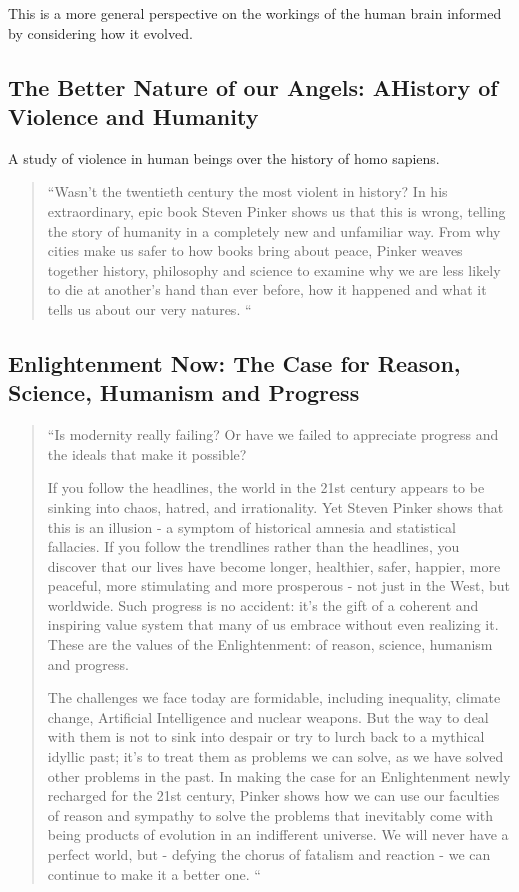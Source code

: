 \documentclass[10pt,titlepage]{book}
\begin{document}
This is a more general perspective on the workings of the human brain informed by considering how it evolved.

\subsection{The Better Nature of our Angels: AHistory of Violence and Humanity \cite{pinker-angels}}

A study of violence in human beings over the history of homo sapiens.

\begin{quote}
``Wasn't the twentieth century the most violent in history? In his extraordinary, epic book Steven Pinker shows us that this is wrong, telling the story of humanity in a completely new and unfamiliar way. From why cities make us safer to how books bring about peace, Pinker weaves together history, philosophy and science to examine why we are less likely to die at another's hand than ever before, how it happened and what it tells us about our very natures.
``
\end{quote}
\subsection{Enlightenment Now: The Case for Reason, Science, Humanism and Progress \cite{pinker-en}}


\begin{quote}
``Is modernity really failing? Or have we failed to appreciate progress and the ideals that make it possible?

If you follow the headlines, the world in the 21st century appears to be sinking into chaos, hatred, and irrationality. Yet Steven Pinker shows that this is an illusion - a symptom of historical amnesia and statistical fallacies. If you follow the trendlines rather than the headlines, you discover that our lives have become longer, healthier, safer, happier, more peaceful, more stimulating and more prosperous - not just in the West, but worldwide. Such progress is no accident: it's the gift of a coherent and inspiring value system that many of us embrace without even realizing it. These are the values of the Enlightenment: of reason, science, humanism and progress.

The challenges we face today are formidable, including inequality, climate change, Artificial Intelligence and nuclear weapons. But the way to deal with them is not to sink into despair or try to lurch back to a mythical idyllic past; it's to treat them as problems we can solve, as we have solved other problems in the past. In making the case for an Enlightenment newly recharged for the 21st century, Pinker shows how we can use our faculties of reason and sympathy to solve the problems that inevitably come with being products of evolution in an indifferent universe. We will never have a perfect world, but - defying the chorus of fatalism and reaction - we can continue to make it a better one.
``
\end{quote}
\end{document}
